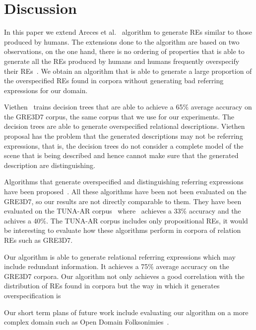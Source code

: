 \section{Discussion}
\label{sec:discussion}

In this paper we extend Areces et al.~ algorithm to generate REs similar to those produced by humans. The extensions done to the algorithm are based on two observations, on the one hand, there is no ordering of properties that is able to generate all the REs produced by humans and humans frequently overspecify their REs~\cite{Engelhardt_Bailey_Ferreira_2006,Arts_Maes_Noordman_Jansen_2011}. We obtain an algorithm that is able to generate a large proportion of the overspecified REs found in corpora without generating bad referring expressions for our domain.

Viethen~ trains decision trees that are able to achieve a 65\% average accuracy on the GRE3D7 corpus, the same corpus that we use for our experiments. The decision trees are able to generate overspecified relational descriptions. Viethen proposal has the problem that the generated descriptions may not be referring expressions, that is, the decision trees do not consider a complete model of the scene that is being described and hence cannot make sure that the generated description are distinguishing.

Algorithms that generate overspecified and distinguishing referring expressions have been proposed~\cite{delucena-paraboni:2008:ENLG,ruud-emiel-mariet:2012:INLG2012}. All these algorithms have been not been evaluated on the GRE3D7, so our results are not directly comparable to them. They have been evaluated on the TUNA-AR corpus~\cite{gatt-balz-kow:2008:ENLG} where~\cite{delucena-paraboni:2008:ENLG} achieves a 33\% accuracy and the~\cite{ruud-emiel-mariet:2012:INLG2012} achives a 40\%. The TUNA-AR corpus includes only propositional REs, it would be interesting to evaluate how these algorithms perform in corpora of relation REs such as GRE3D7. 

Our algorithm is able to generate relational referring expressions which may include redundant information. It achieves a 75\% average accuracy on the GRE3D7 corpora. Our algorithm not only achieves a good correlation with the distribution of REs found in corpora but the way in which it generates overspecification is 


Our short term plans of future work include evaluating our algorithm on a more complex domain such as Open Domain Folksonimies~\cite{pacheco-duboue-dominguez:2012:NAACL-HLT}. 

